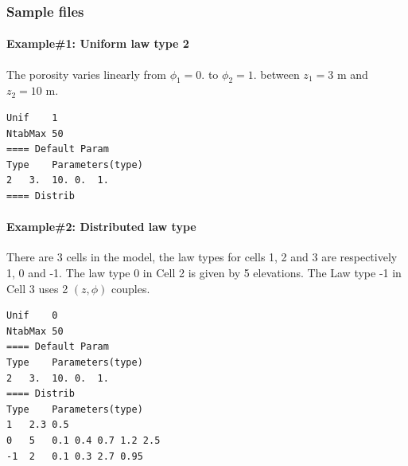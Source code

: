 \subsubsection{Sample files}
%
\paragraph*{Example\#1: Uniform law type 2}
The porosity varies linearly from $\phi_1=0.$ to $\phi_2=1.$ between $z_1=3$ m and $z_2=10$ m.
\begin{verbatim}
Unif	1
NtabMax	50
==== Default Param
Type	Parameters(type)
2	3.	10.	0.	1.
==== Distrib
\end{verbatim}
%
\paragraph*{Example\#2: Distributed law type}
There are 3 cells in the model, the law types for cells 1, 2 and 3 are respectively 1, 0 and -1. The law type 0 in Cell 2 is given by 5 elevations. The Law type -1 in Cell 3 uses 2 $(z,\phi)$ couples.
\begin{verbatim}
Unif	0
NtabMax	50
==== Default Param
Type	Parameters(type)
2	3.	10.	0.	1.
==== Distrib
Type	Parameters(type)
1   2.3 0.5
0   5   0.1 0.4 0.7 1.2 2.5
-1  2   0.1 0.3 2.7 0.95
\end{verbatim}